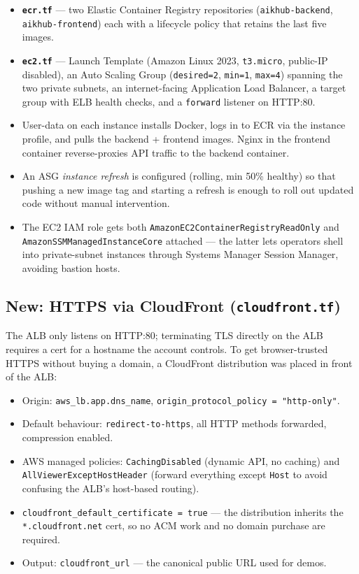 \documentclass[11pt,a4paper]{article}
\begin{document}
\begin{itemize}[leftmargin=*]
  \item \textbf{\texttt{ecr.tf}} --- two Elastic Container Registry
        repositories (\texttt{aikhub-backend}, \texttt{aikhub-frontend})
        each with a lifecycle policy that retains the last five images.
  \item \textbf{\texttt{ec2.tf}} --- Launch Template (Amazon Linux 2023,
        \texttt{t3.micro}, public-IP disabled), an Auto Scaling Group
        (\texttt{desired=2}, \texttt{min=1}, \texttt{max=4}) spanning the
        two private subnets, an internet-facing Application Load
        Balancer, a target group with ELB health checks, and a
        \texttt{forward} listener on HTTP:80.
  \item User-data on each instance installs Docker, logs in to ECR via
        the instance profile, and pulls the backend + frontend images.
        Nginx in the frontend container reverse-proxies API traffic to
        the backend container.
  \item An ASG \emph{instance refresh} is configured (rolling, min 50\%
        healthy) so that pushing a new image tag and starting a refresh
        is enough to roll out updated code without manual intervention.
  \item The EC2 IAM role gets both \texttt{AmazonEC2ContainerRegistryReadOnly}
        and \texttt{AmazonSSMManagedInstanceCore} attached --- the latter
        lets operators shell into private-subnet instances through
        Systems Manager Session Manager, avoiding bastion hosts.
\end{itemize}

\subsection{New: HTTPS via CloudFront (\texttt{cloudfront.tf})}

The ALB only listens on HTTP:80; terminating TLS directly on the ALB
requires a cert for a hostname the account controls. To get browser-trusted
HTTPS without buying a domain, a CloudFront distribution was placed in
front of the ALB:

\begin{itemize}[leftmargin=*]
  \item Origin: \texttt{aws\_lb.app.dns\_name}, \texttt{origin\_protocol\_policy = "http-only"}.
  \item Default behaviour: \texttt{redirect-to-https}, all HTTP methods
        forwarded, compression enabled.
  \item AWS managed policies: \texttt{CachingDisabled} (dynamic API, no
        caching) and \texttt{AllViewerExceptHostHeader} (forward
        everything except \texttt{Host} to avoid confusing the ALB's
        host-based routing).
  \item \texttt{cloudfront\_default\_certificate = true} --- the
        distribution inherits the \texttt{*.cloudfront.net} cert, so no
        ACM work and no domain purchase are required.
  \item Output: \texttt{cloudfront\_url} --- the canonical public URL
        used for demos.
\end{itemize}
\end{document}
